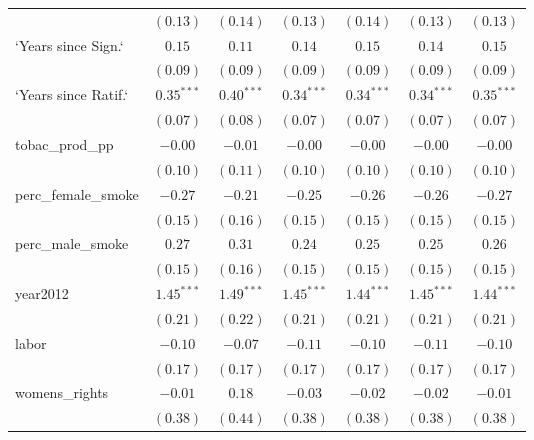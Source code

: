 \begin{table}[!h]
\begin{center}
\begin{tabular}{l c c c c c c }
                        & $(0.13)$     & $(0.14)$     & $(0.13)$     & $(0.14)$     & $(0.13)$     & $(0.13)$     \\
`Years since Sign.`     & $0.15$       & $0.11$       & $0.14$       & $0.15$       & $0.14$       & $0.15$       \\
                        & $(0.09)$     & $(0.09)$     & $(0.09)$     & $(0.09)$     & $(0.09)$     & $(0.09)$     \\
`Years since Ratif.`    & $0.35^{***}$ & $0.40^{***}$ & $0.34^{***}$ & $0.34^{***}$ & $0.34^{***}$ & $0.35^{***}$ \\
                        & $(0.07)$     & $(0.08)$     & $(0.07)$     & $(0.07)$     & $(0.07)$     & $(0.07)$     \\
tobac\_prod\_pp         & $-0.00$      & $-0.01$      & $-0.00$      & $-0.00$      & $-0.00$      & $-0.00$      \\
                        & $(0.10)$     & $(0.11)$     & $(0.10)$     & $(0.10)$     & $(0.10)$     & $(0.10)$     \\
perc\_female\_smoke     & $-0.27$      & $-0.21$      & $-0.25$      & $-0.26$      & $-0.26$      & $-0.27$      \\
                        & $(0.15)$     & $(0.16)$     & $(0.15)$     & $(0.15)$     & $(0.15)$     & $(0.15)$     \\
perc\_male\_smoke       & $0.27$       & $0.31$       & $0.24$       & $0.25$       & $0.25$       & $0.26$       \\
                        & $(0.15)$     & $(0.16)$     & $(0.15)$     & $(0.15)$     & $(0.15)$     & $(0.15)$     \\
year2012                & $1.45^{***}$ & $1.49^{***}$ & $1.45^{***}$ & $1.44^{***}$ & $1.45^{***}$ & $1.44^{***}$ \\
                        & $(0.21)$     & $(0.22)$     & $(0.21)$     & $(0.21)$     & $(0.21)$     & $(0.21)$     \\
labor                   & $-0.10$      & $-0.07$      & $-0.11$      & $-0.10$      & $-0.11$      & $-0.10$      \\
                        & $(0.17)$     & $(0.17)$     & $(0.17)$     & $(0.17)$     & $(0.17)$     & $(0.17)$     \\
womens\_rights          & $-0.01$      & $0.18$       & $-0.03$      & $-0.02$      & $-0.02$      & $-0.01$      \\
                        & $(0.38)$     & $(0.44)$     & $(0.38)$     & $(0.38)$     & $(0.38)$     & $(0.38)$     \\

\end{tabular}
\end{center}
\end{table}
